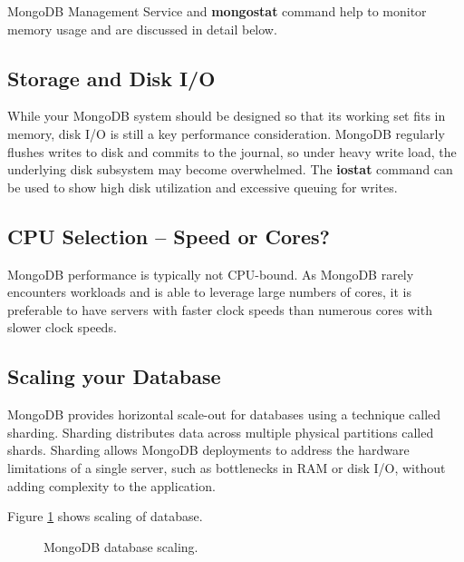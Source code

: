 \documentclass[9pt,twocolumn,twoside]{styles/osajnl}
\begin{document}
MongoDB Management Service and {\bfseries mongostat} command help to monitor memory usage and are discussed in detail below.

\subsection {Storage and Disk I/O}

While your MongoDB system should be designed so that its working set fits in memory, disk I/O is still a key performance consideration. MongoDB regularly flushes writes to disk and commits to the journal, so under heavy write load, the underlying disk subsystem may become overwhelmed. The {\bfseries iostat} command can be used to show high disk utilization and excessive queuing for writes.

\subsection {CPU Selection – Speed or Cores?}

MongoDB performance is typically not CPU-bound. As MongoDB rarely encounters workloads and is able to leverage large numbers of cores, it is preferable to have servers with faster clock speeds than numerous cores with slower clock speeds.

\subsection {Scaling your Database}

MongoDB provides horizontal scale-out for databases using a technique called sharding. Sharding distributes data across multiple physical partitions called shards. Sharding allows MongoDB deployments to address the hardware limitations of a single server, such as bottlenecks in RAM or disk I/O, without adding complexity to the application.

Figure \ref{fig:figure1} shows scaling of database.

\begin{figure}[htbp]
\centering
{}
\caption{MongoDB database scaling.}
\label{fig:figure1}
\end{figure}
\end{document}
